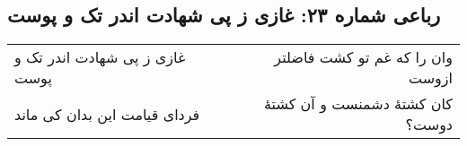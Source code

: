 \begin{center}
\section*{رباعی شماره ۲۳: غازی ز پی شهادت اندر تک و پوست}
\label{sec:023}
\begin{longtable}{l p{0.5cm} r}
غازی ز پی شهادت اندر تک و پوست
&&
وان را که غم تو کشت فاضلتر ازوست
\\
فردای قیامت این بدان کی ماند
&&
کان کشتهٔ دشمنست و آن کشتهٔ دوست؟
\\
\end{longtable}
\end{center}
